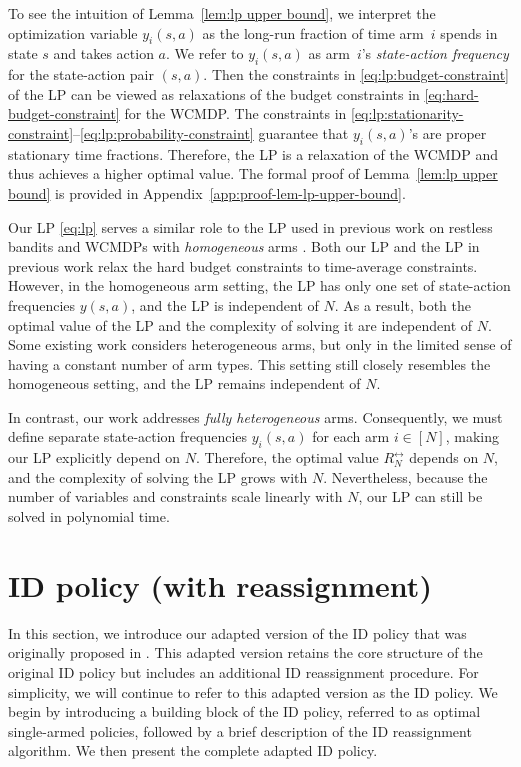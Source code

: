 \documentclass[11pt,letterpaper]{article}
\begin{document}
To see the intuition of Lemma~\ref{lem:lp upper bound}, we interpret the optimization variable $y_i(s,a)$ as the long-run fraction of time arm~$i$ spends in state $s$ and takes action $a$.
We refer to $y_i(s,a)$ as arm~$i$'s \emph{state-action frequency} for the state-action pair $(s,a)$.
Then the constraints in \eqref{eq:lp:budget-constraint} of the LP can be viewed as relaxations of the budget constraints in \eqref{eq:hard-budget-constraint} for the WCMDP.
The constraints in \eqref{eq:lp:stationarity-constraint}--\eqref{eq:lp:probability-constraint} guarantee that $y_i(s,a)$'s are proper stationary time fractions.
Therefore, the LP is a relaxation of the WCMDP and thus achieves a higher optimal value.
The formal proof of Lemma~\ref{lem:lp upper bound} is provided in Appendix~\ref{app:proof-lem-lp-upper-bound}.


Our LP \eqref{eq:lp} serves a similar role to the LP used in previous work on restless bandits and WCMDPs with \emph{homogeneous} arms \citep[see, e.g.,][]{WebWei_90,GasGauYan_23_exponential,HonXieChe_23}. 
Both our LP and the LP in previous work relax the hard budget constraints to time-average constraints.
However, in the homogeneous arm setting, the LP has only one set of state-action frequencies $y(s,a)$, and the LP is independent of $N$.
As a result, both the optimal value of the LP and the complexity of solving it are independent of $N$.
Some existing work \citep{Ver_16_verloop} considers heterogeneous arms, but only in the limited sense of having a constant number of arm types. 
This setting still closely resembles the homogeneous setting, and the LP remains independent of $N$.

In contrast, our work addresses \emph{fully heterogeneous} arms. 
Consequently, we must define separate state-action frequencies $y_i(s,a)$ for each arm $i\in[N]$, making our LP explicitly depend on $N$. 
Therefore, the optimal value $R_N^{\rel}$ depends on $N$, and the complexity of solving the LP grows with $N$. 
Nevertheless, because the number of variables and constraints scale linearly with $N$, our LP can still be solved in polynomial time.




\section{ID policy (with reassignment)}
In this section, we introduce our adapted version of the ID policy that was originally proposed in \citep{HonXieChe_24}. 
This adapted version retains the core structure of the original ID policy but includes an additional ID reassignment procedure. 
For simplicity, we will continue to refer to this adapted version as the ID policy.
We begin by introducing a building block of the ID policy, referred to as optimal single-armed policies, followed by a brief description of the ID reassignment algorithm.
We then present the complete adapted ID policy.
\end{document}
